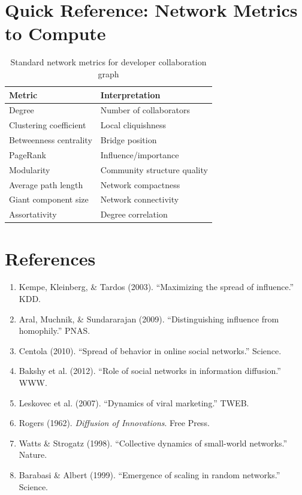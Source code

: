 \documentclass[11pt,letterpaper]{article}
\begin{document}
\section{Quick Reference: Network Metrics to Compute}

\begin{table}[h]
\centering
\begin{tabular}{ll}
\toprule
\textbf{Metric} & \textbf{Interpretation} \\
\midrule
Degree & Number of collaborators \\
Clustering coefficient & Local cliquishness \\
Betweenness centrality & Bridge position \\
PageRank & Influence/importance \\
Modularity & Community structure quality \\
Average path length & Network compactness \\
Giant component size & Network connectivity \\
Assortativity & Degree correlation \\
\bottomrule
\end{tabular}
\caption{Standard network metrics for developer collaboration graph}
\end{table}

\section{References}

\begin{enumerate}
    \item Kempe, Kleinberg, \& Tardos (2003). ``Maximizing the spread of influence.'' KDD.
    \item Aral, Muchnik, \& Sundararajan (2009). ``Distinguishing influence from homophily.'' PNAS.
    \item Centola (2010). ``Spread of behavior in online social networks.'' Science.
    \item Bakshy et al. (2012). ``Role of social networks in information diffusion.'' WWW.
    \item Leskovec et al. (2007). ``Dynamics of viral marketing.'' TWEB.
    \item Rogers (1962). \textit{Diffusion of Innovations}. Free Press.
    \item Watts \& Strogatz (1998). ``Collective dynamics of small-world networks.'' Nature.
    \item Barabasi \& Albert (1999). ``Emergence of scaling in random networks.'' Science.
\end{enumerate}
\end{document}
